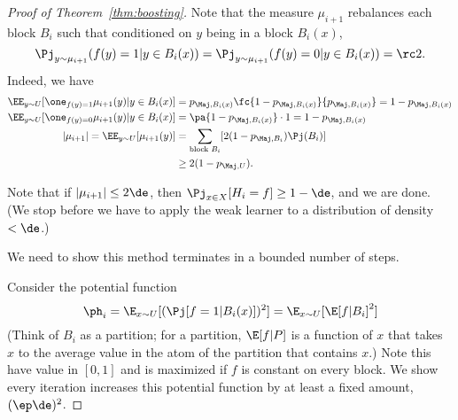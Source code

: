 \begin{proof}[Proof of Theorem~\ref{thm:boosting}]
Note that the measure $\mu_{i+1}$ rebalances %
each block $B_i$ such that conditioned on $y$ being in a block $B_i(x)$, 
$$\Pj_{y\sim \mu_{i+1}}(f(y)=1|y\in B_i(x)) = \Pj_{y \sim \mu_{i+1}}(f(y)=0|y\in B_i(x))=\rc 2.$$
Indeed, we have
\begin{align}
\EE_{y\sim U}[\one_{f(y)=1} 
 \mu_{i+1}(y) |y\in B_i(x)]
 &=p_{\Maj, B_i(x)} \fc{1-p_{\Maj, B_i(x)}}{p_{\Maj, B_i(x)}} = 1-p_{\Maj, B_i(x)}\\
 \EE_{y\sim U}[\one_{f(y)=0} 
 \mu_{i+1}(y) |y\in B_i(x)]
 &=\pa{1-p_{\Maj, B_i(x)}}\cdot 1 = 1-p_{\Maj, B_i(x)}\\
|\mu_{i+1}| =  \EE_{y\sim U}[
 \mu_{i+1}(y)]&=\sum_{\text{block }B_i} [2(1-p_{\Maj, B_i}) \Pj(B_i)]\\
 & \ge 2(1-p_{\Maj,U}).
\end{align}

Note that if $|\mu_{i+1}|\le 2\de$, then $\Pj_{x\in X}[H_i=f]\ge 1-\de$, and we are done. (We stop before we have to apply the weak learner to a distribution of density $<\de$.)

We need to show this method terminates in a bounded number of steps.

Consider the potential function
$$
\ph_i = \E_{x\sim U} [(\Pj[f=1|B_i(x)])^2]
 = \E_{x\sim U} [\E[ f|B_i]^2]
$$
(Think of $B_i$ as a partition; for a partition, $\E[f|P]$ is a function of $x$ that takes $x$ to the average value in the atom of the partition that contains $x$.)
Note this have value in $[0,1]$ and is maximized if $f$ is constant on every block. We show every iteration increases this potential 
function by at least a fixed amount, $(\ep\de)^2$.


\end{proof}
